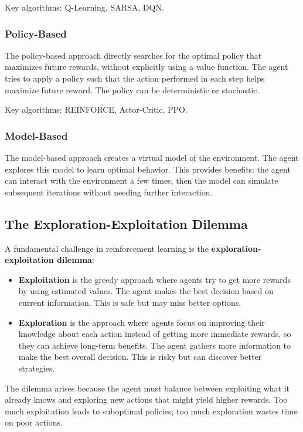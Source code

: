 \documentclass[11pt,a4paper]{article}
\begin{document}
Key algorithms: Q-Learning, SARSA, DQN.

\subsubsection{Policy-Based}

The policy-based approach directly searches for the optimal policy that maximizes future rewards, without explicitly using a value function. The agent tries to apply a policy such that the action performed in each step helps maximize future reward. The policy can be deterministic or stochastic.

Key algorithms: REINFORCE, Actor-Critic, PPO.

\subsubsection{Model-Based}

The model-based approach creates a virtual model of the environment. The agent explores this model to learn optimal behavior. This provides benefits: the agent can interact with the environment a few times, then the model can simulate subsequent iterations without needing further interaction.

\subsection{The Exploration-Exploitation Dilemma}

A fundamental challenge in reinforcement learning is the \textbf{exploration-exploitation dilemma}:

\begin{itemize}
    \item \textbf{Exploitation} is the greedy approach where agents try to get more rewards by using estimated values. The agent makes the best decision based on current information. This is safe but may miss better options.
    \item \textbf{Exploration} is the approach where agents focus on improving their knowledge about each action instead of getting more immediate rewards, so they can achieve long-term benefits. The agent gathers more information to make the best overall decision. This is risky but can discover better strategies.
\end{itemize}

The dilemma arises because the agent must balance between exploiting what it already knows and exploring new actions that might yield higher rewards. Too much exploitation leads to suboptimal policies; too much exploration wastes time on poor actions.
\end{document}
